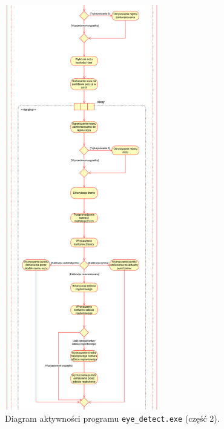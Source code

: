\documentclass[a4paper,twoside,12pt]{book}
\begin{document}
\begin{figure}[htbp]
	\centering
	\includegraphics[width=0.6\textwidth, height=0.96\textheight]{pic/diagram aktywności/druga próba/diagram aktywności 2.png}
	\caption{Diagram aktywności programu \texttt{eye\-\_detect.exe} (część 2).}
	\label{fig:diagram-aktywnosci-2}
\end{figure}
\end{document}
